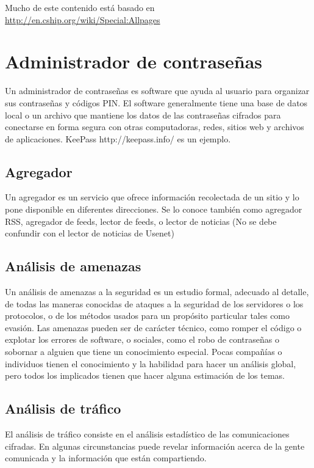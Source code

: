 Mucho de este contenido está basado en
\url{http://en.cship.org/wiki/Special:Allpages}

\section{Administrador de
contraseñas}\label{administrador-de-contraseuxf1as}

Un administrador de contraseñas es software que ayuda al usuario para
organizar sus contraseñas y códigos PIN. El software generalmente tiene
una base de datos local o un archivo que mantiene los datos de las
contraseñas cifrados para conectarse en forma segura con otras
computadoras, redes, sitios web y archivos de aplicaciones. KeePass
http://keepass.info/ es un ejemplo.

\subsection{Agregador}\label{agregador}

Un agregador es un servicio que ofrece información recolectada de un
sitio y lo pone disponible en diferentes direcciones. Se lo conoce
también como agregador RSS, agregador de feeds, lector de feeds, o
lector de noticias (No se debe confundir con el lector de noticias de
Usenet)

\subsection{Análisis de amenazas}\label{anuxe1lisis-de-amenazas}

Un análisis de amenazas a la seguridad es un estudio formal, adecuado al
detalle, de todas las maneras conocidas de ataques a la seguridad de los
servidores o los protocolos, o de los métodos usados para un propósito
particular tales como evasión. Las amenazas pueden ser de carácter
técnico, como romper el código o explotar los errores de software, o
sociales, como el robo de contraseñas o sobornar a alguien que tiene un
conocimiento especial. Pocas compañías o individuos tienen el
conocimiento y la habilidad para hacer un análisis global, pero todos
los implicados tienen que hacer alguna estimación de los temas.

\subsection{Análisis de tráfico}\label{anuxe1lisis-de-truxe1fico}

El análisis de tráfico consiste en el análisis estadístico de las
comunicaciones cifradas. En algunas circunstancias puede revelar
información acerca de la gente comunicada y la información que están
compartiendo.

